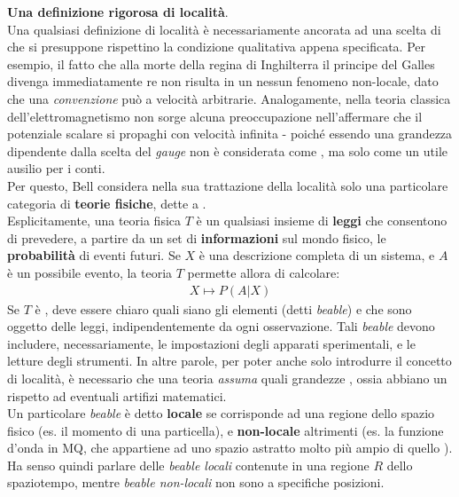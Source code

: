\documentclass[../../InformazioneQuantistica.tex]{subfiles}
\begin{document}
\begin{expl}
\textbf{Una definizione rigorosa di località}\cite{Bell-causality}\cite{Stanford-beables}.\\ Una qualsiasi definizione di località è necessariamente ancorata ad una scelta di  che si presuppone rispettino la condizione qualitativa appena specificata. Per esempio, il fatto che alla morte della regina di Inghilterra il principe del Galles divenga immediatamente re non risulta in un nessun fenomeno non-locale, dato che una \textit{convenzione} può  a velocità arbitrarie. Analogamente, nella teoria classica dell'elettromagnetismo non sorge alcuna preoccupazione nell'affermare che il potenziale scalare si propaghi con velocità infinita - poiché essendo una grandezza dipendente dalla scelta del \textit{gauge} non è considerata come , ma solo come un utile ausilio per i conti.\\
Per questo, Bell considera nella sua trattazione della località solo una particolare categoria di \textbf{teorie fisiche}, dette a .\\
Esplicitamente, una teoria fisica $T$ è un qualsiasi insieme di \textbf{leggi} che consentono di prevedere, a partire da un set di \textbf{informazioni} sul mondo fisico, le \textbf{probabilità} di eventi futuri. Se $X$ è una descrizione completa di un sistema, e $A$ è un possibile evento, la teoria $T$ permette allora di calcolare:
\begin{align*}
X \mapsto P(A|X)
\end{align*}
 Se $T$ è , deve essere chiaro quali siano gli elementi  (detti \textit{beable}) e che sono oggetto delle leggi, indipendentemente da ogni osservazione. Tali \textit{beable} devono includere, necessariamente, le impostazioni degli apparati sperimentali, e le letture degli strumenti. In altre parole, per poter anche solo introdurre il concetto di località, è necessario che una teoria \textit{assuma} quali grandezze , ossia abbiano un  rispetto ad eventuali artifizi matematici.\\
Un particolare \textit{beable} è detto \textbf{locale} se corrisponde ad una regione dello spazio fisico (es. il momento di una particella), e \textbf{non-locale} altrimenti (es. la funzione d'onda in MQ, che appartiene ad uno spazio astratto molto più ampio di quello ). Ha senso quindi parlare delle \textit{beable locali} contenute in una regione $R$ dello spaziotempo, mentre \textit{beable non-locali} non sono  a specifiche posizioni. \\


\end{expl}
\end{document}

